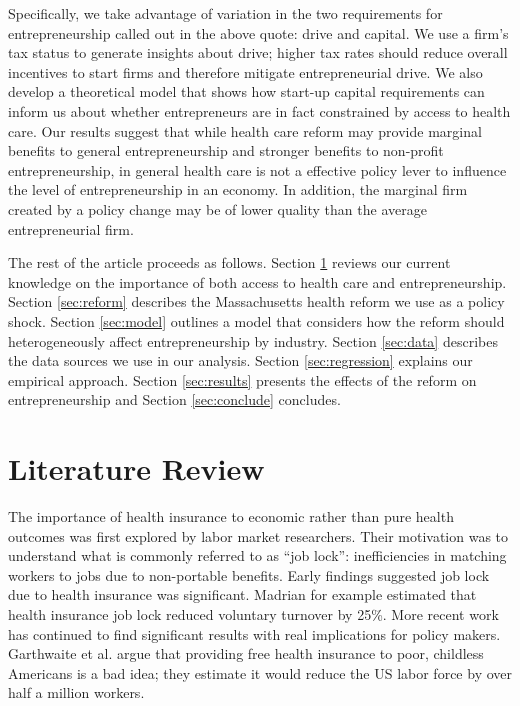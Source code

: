 \documentclass[12pt]{article}
\begin{document}
Specifically, we take advantage of variation in the two requirements for entrepreneurship called out in the above quote: drive and capital. We use a firm's tax status to generate insights about drive; higher tax rates should reduce overall incentives to start firms and therefore mitigate entrepreneurial drive. We also develop a theoretical model that shows how start-up capital requirements can inform us about whether entrepreneurs are in fact constrained by access to health care. Our results suggest that while health care reform may provide marginal benefits to general entrepreneurship and stronger benefits to non-profit entrepreneurship, in general health care is not a effective policy lever to influence the level of entrepreneurship in an economy. In addition, the marginal firm created by a policy change may be of lower quality than the average entrepreneurial firm.

The rest of the article proceeds as follows. Section \ref{sec:review} reviews our current knowledge on the importance of both access to health care and entrepreneurship. Section \ref{sec:reform} describes the Massachusetts health reform we use as a policy shock. Section \ref{sec:model} outlines a model that considers how the reform should heterogeneously affect entrepreneurship by industry. Section \ref{sec:data} describes the data sources we use in our analysis. Section \ref{sec:regression} explains our empirical approach. Section \ref{sec:results} presents the effects of the reform on entrepreneurship and Section \ref{sec:conclude} concludes. 

\section{Literature Review}
\label{sec:review}

The importance of health insurance to economic rather than pure health outcomes was first explored by labor market researchers. Their motivation was to understand what is commonly referred to as ``job lock'': inefficiencies in matching workers to jobs due to non-portable benefits. Early findings suggested job lock due to health insurance was significant. Madrian \citep{madrian1994employment} for example estimated that health insurance job lock reduced voluntary turnover by 25\%. More recent work has continued to find significant results with real implications for policy makers. Garthwaite et al. \citep{garthwaite2014public} argue that providing free health insurance to poor, childless Americans is a bad idea; they estimate it would reduce the US labor force by over half a million workers. 
\end{document}
